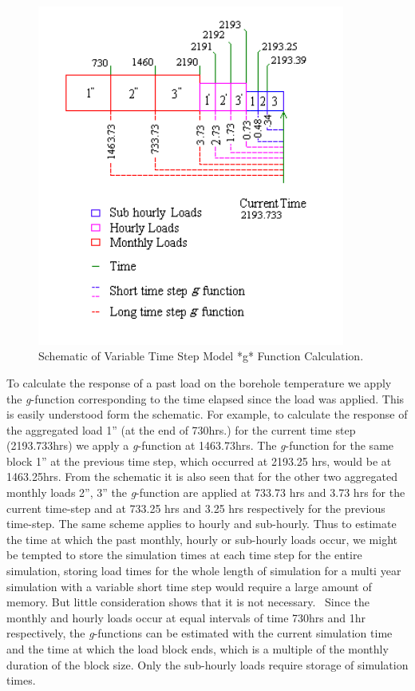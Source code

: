\begin{figure}[hbtp] %
\centering
\includegraphics[width=0.9\textwidth, height=0.9\textheight, keepaspectratio=true]{media/image5656.png}
\caption{  Schematic of Variable Time Step Model *g* Function Calculation. \protect \label{fig:schematic-of-variable-time-step-model-g}}
\end{figure}

To calculate the response of a past load on the borehole temperature we apply the \emph{g}-function corresponding to the time elapsed since the load was applied. This is easily understood form the schematic. For example, to calculate the response of the aggregated load 1'' (at the end of 730hrs.) for the current time step (2193.733hrs) we apply a \emph{g}-function at 1463.73hrs. The \emph{g}-function for the same block 1'' at the previous time step, which occurred at 2193.25 hrs, would be at 1463.25hrs. From the schematic it is also seen that for the other two aggregated monthly loads 2'', 3'' the \emph{g}-function are applied at 733.73 hrs and 3.73 hrs for the current time-step and at 733.25 hrs and 3.25 hrs respectively for the previous time-step. The same scheme applies to hourly and sub-hourly. Thus to estimate the time at which the past monthly, hourly or sub-hourly loads occur, we might be tempted to store the simulation times at each time step for the entire simulation, storing load times for the whole length of simulation for a multi year simulation with a variable short time step would require a large amount of memory. But little consideration shows that it is not necessary.~ Since the monthly and hourly loads occur at equal intervals of time 730hrs and 1hr respectively, the \emph{g}-functions can be estimated with the current simulation time and the time at which the load block ends, which is a multiple of the monthly duration of the block size. Only the sub-hourly loads require storage of simulation times.

